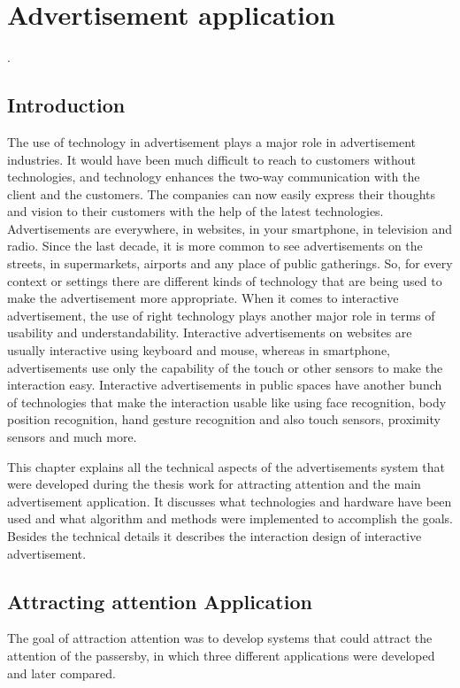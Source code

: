 \chapter{Advertisement application} %

\label{Chapter7} %
\newpage
.
\newpage

\section{Introduction}
The use of technology in advertisement plays a major role in advertisement industries. It would have been much difficult to reach to customers without technologies, and technology enhances the two-way communication with the client and the customers. The companies can now easily express their thoughts and vision to their customers with the help of the latest technologies. Advertisements are everywhere, in websites, in your smartphone, in television and radio. Since the last decade, it is more common to see advertisements on the streets, in supermarkets, airports and any place of public gatherings.
So, for every context or settings there are different kinds of technology that are being used to make the advertisement more appropriate. When it comes to interactive advertisement, the use of right technology plays another major role in terms of usability and understandability. Interactive advertisements on websites are usually interactive using keyboard and mouse, whereas in smartphone, advertisements use only the capability of the touch or other sensors to make the interaction easy. Interactive advertisements in public spaces have another bunch of technologies that make the interaction usable like using face recognition, body position recognition, hand gesture recognition and also touch sensors, proximity sensors and much more.


This chapter explains all the technical aspects of the advertisements system that were developed during the thesis work for attracting attention and the main advertisement application. It discusses what technologies and hardware have been used and what algorithm and methods were implemented to accomplish the goals. Besides the technical details it describes the interaction design of interactive advertisement.



\iffalse
\section{Attracting attention Application}
The goal of attraction attention was to develop systems that could attract the attention of the passersby, in which three different applications were developed and later compared.

